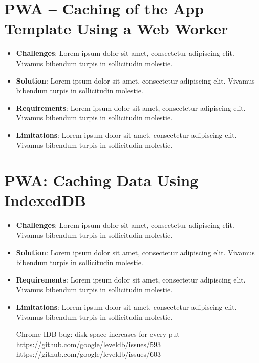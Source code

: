 \documentclass[11pt, a4paper]{article}
\begin{document}
\section{PWA – Caching of the App Template Using a Web Worker}
\begin{itemize}
  \item \textbf{Challenges}: Lorem ipsum dolor sit amet, consectetur adipiscing elit. Vivamus
  bibendum turpis in sollicitudin molestie.
  \item \textbf{Solution}: Lorem ipsum dolor sit amet, consectetur adipiscing elit. Vivamus bibendum
  turpis in sollicitudin molestie.
  \item \textbf{Requirements}: Lorem ipsum dolor sit amet, consectetur adipiscing elit. Vivamus
  bibendum turpis in sollicitudin molestie.
  \item \textbf{Limitations}: Lorem ipsum dolor sit amet, consectetur adipiscing elit. Vivamus
  bibendum turpis in sollicitudin molestie.
\end{itemize}

\section{PWA: Caching Data Using IndexedDB}
\begin{itemize}
  \item \textbf{Challenges}: Lorem ipsum dolor sit amet, consectetur adipiscing elit. Vivamus
  bibendum turpis in sollicitudin molestie.
  \item \textbf{Solution}: Lorem ipsum dolor sit amet, consectetur adipiscing elit. Vivamus bibendum
  turpis in sollicitudin molestie.
  \item \textbf{Requirements}: Lorem ipsum dolor sit amet, consectetur adipiscing elit. Vivamus
  bibendum turpis in sollicitudin molestie.
  \item \textbf{Limitations}: Lorem ipsum dolor sit amet, consectetur adipiscing elit. Vivamus
  bibendum turpis in sollicitudin molestie.

  Chrome IDB bug: disk space increases for every put
  https://github.com/google/leveldb/issues/593
  https://github.com/google/leveldb/issues/603
\end{itemize}
\end{document}
